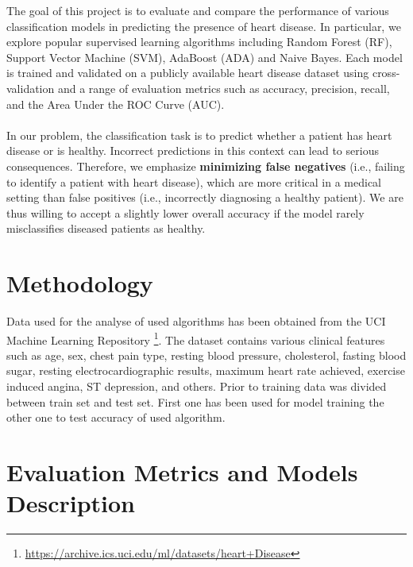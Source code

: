 \documentclass[conference]{IEEEtran}
\begin{document}
The goal of this project is to evaluate and compare the performance of various classification models 
in predicting the presence of heart disease. In particular, we explore popular supervised learning 
algorithms including Random Forest (RF), Support Vector Machine (SVM), AdaBoost (ADA) and Naive Bayes. Each model 
is trained and validated on a publicly available heart disease dataset using cross-validation and a 
range of evaluation metrics such as accuracy, precision, recall, and the Area Under the ROC Curve (AUC).
\\ \\
In our problem, the classification task is to predict whether a patient has heart disease or is healthy.
Incorrect predictions in this context can lead to serious consequences. Therefore, we emphasize \textbf{minimizing 
false negatives} (i.e., failing to identify a patient with heart disease), which are more critical in a 
medical setting than false positives (i.e., incorrectly diagnosing a healthy patient). 
We are thus willing to accept a slightly lower overall accuracy if the model rarely misclassifies 
diseased patients as healthy.


\section{Methodology}
Data used for the analyse of used algorithms has been 
obtained from the UCI Machine Learning Repository \footnote{\url{https://archive.ics.uci.edu/ml/datasets/heart+Disease}}.
The dataset contains various clinical features such as age, sex, chest pain type,
resting blood pressure, cholesterol, fasting blood sugar,
resting electrocardiographic results, maximum heart rate achieved,
exercise induced angina, ST depression, and others. Prior to training
data was divided between train set and test set. First one has been used
for model training the other one to test accuracy of used algorithm.

\section{Evaluation Metrics and Models Description}
\end{document}
